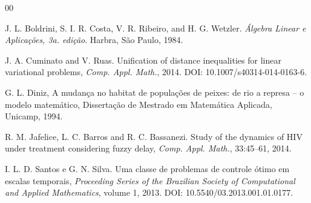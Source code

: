 \documentclass[a4,11pt]{wmecai}
\begin{document}
\begin{thebibliography}{00}

J. L. Boldrini, S. I. R. Costa, V. R. Ribeiro, and H. G. Wetzler. {\it Álgebra Linear e Aplicações, 3a. edição}. Harbra, São Paulo, 1984.

J. A. Cuminato and V. Ruas. Unification of distance inequalities for linear variational problems,
{\it Comp. Appl. Math.}, 2014. DOI: 10.1007/s40314-014-0163-6.

G. L. Diniz, A mudança no habitat de populações de peixes: de rio a represa -- o modelo matemático, Dissertação de Mestrado em Matemática Aplicada, Unicamp, 1994.

 R. M. Jafelice, L. C. Barros and R. C. Bassanezi. Study of the dynamics of HIV under
treatment considering fuzzy delay, {\it Comp. Appl. Math.}, 33:45--61, 2014.

 I. L. D. Santos e G. N. Silva. Uma classe de problemas de controle ótimo
em escalas temporais, {\it Proceeding Series of the Brazilian Society of Computational and
Applied Mathematics}, volume 1, 2013. DOI: 10.5540/03.2013.001.01.0177.

\end{thebibliography}
\end{document}
